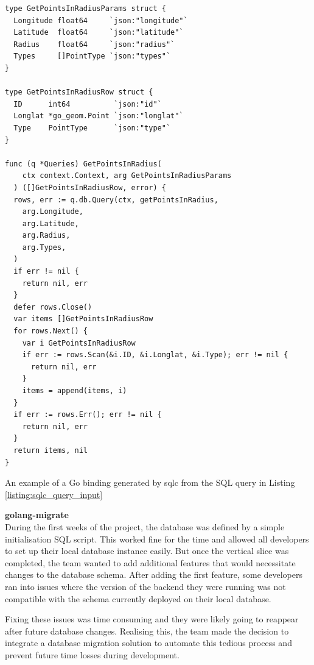 \begin{listing}[htbp]
  \centering{}
  \begin{minipage}{0.85\textwidth}
  \begin{verbatim}
type GetPointsInRadiusParams struct {
  Longitude float64     `json:"longitude"`
  Latitude  float64     `json:"latitude"`
  Radius    float64     `json:"radius"`
  Types     []PointType `json:"types"`
}

type GetPointsInRadiusRow struct {
  ID      int64          `json:"id"`
  Longlat *go_geom.Point `json:"longlat"`
  Type    PointType      `json:"type"`
}

func (q *Queries) GetPointsInRadius(
    ctx context.Context, arg GetPointsInRadiusParams
  ) ([]GetPointsInRadiusRow, error) {
  rows, err := q.db.Query(ctx, getPointsInRadius,
    arg.Longitude,
    arg.Latitude,
    arg.Radius,
    arg.Types,
  )
  if err != nil {
    return nil, err
  }
  defer rows.Close()
  var items []GetPointsInRadiusRow
  for rows.Next() {
    var i GetPointsInRadiusRow
    if err := rows.Scan(&i.ID, &i.Longlat, &i.Type); err != nil {
      return nil, err
    }
    items = append(items, i)
  }
  if err := rows.Err(); err != nil {
    return nil, err
  }
  return items, nil
}
  \end{verbatim}
  \end{minipage}
  \caption{An example of a Go binding generated by sqlc from the SQL query in
  Listing \ref{listing:sqlc_query_input}}
  \label{listing:sqlc_generated_bindings}
\end{listing}

\newpage{}

\textbf{golang-migrate}\\
During the first weeks of the project, the database was defined by a simple
initialisation SQL script. This worked fine for the time and allowed all
developers to set up their local database instance easily. But once the vertical
slice was completed, the team wanted to add additional features that would
necessitate changes to the database schema. After adding the first feature, some
developers ran into issues where the version of the backend they were running
was not compatible with the schema currently deployed on their local database.

Fixing these issues was time consuming and they were likely going to reappear
after future database changes. Realising this, the team made the decision to
integrate a database migration solution to automate this tedious process and
prevent future time losses during development.

